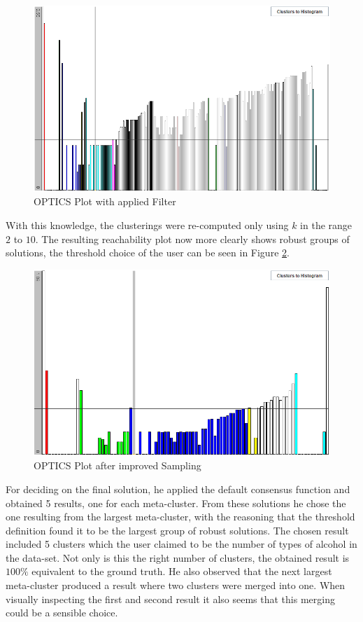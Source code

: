 \documentclass[
	a4paper,
	english,
	twoside,
	openright,               
	11pt                            
	]{report}
\begin{document}
\begin{figure}[h]
	\centering
	\includegraphics[scale=.5]{user_qcm_optics}
	\caption{OPTICS Plot with applied Filter}
	\label{fig:user_qcm_optics}
\end{figure}

With this knowledge, the clusterings were re-computed only using $k$ in the range $2$ to $10$. The resulting reachability plot now more clearly shows robust groups of solutions, the threshold choice of the user can be seen in Figure \ref{fig:user_qcm_optics2}.

\begin{figure}[h]
	\centering
	\includegraphics[scale=.5]{user_qcm_optics2}
	\caption{OPTICS Plot after improved Sampling}
	\label{fig:user_qcm_optics2}
\end{figure}

For deciding on the final solution, he applied the default consensus function and obtained 5 results, one for each meta-cluster. From these solutions he chose the one resulting from the largest meta-cluster, with the reasoning that the threshold definition found it to be the largest group of robust solutions. The chosen result included 5 clusters which the user claimed to be the number of types of alcohol in the data-set. Not only is this the right number of clusters, the obtained result is $100\% $ equivalent to the ground truth. He also observed that the next largest meta-cluster produced a result where two clusters were merged into one. When visually inspecting the first and second result it also seems that this merging could be a sensible choice.
\end{document}

